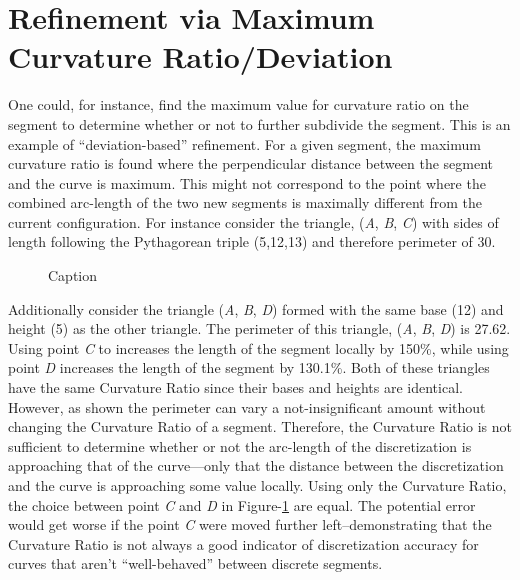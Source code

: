 \section{Refinement via Maximum Curvature Ratio/Deviation}
One could, for instance, find the maximum value for curvature ratio on the segment to determine whether or not to further subdivide the segment.  This is an example of “deviation-based” refinement.  For a given segment, the maximum curvature ratio is found where the perpendicular distance between the segment and the curve is maximum.  This might not correspond to the point where the combined arc-length of the two new segments is maximally different from the current configuration.  For instance consider the triangle, (\textit{A}, \textit{B}, \textit{C}) with sides of length following the Pythagorean triple (5,12,13) and therefore perimeter of 30.

\begin{figure}[h!]
  \caption{\label{CurvatureRatioTriangles} Caption}
\end{figure}

\noindent Additionally consider the triangle (\textit{A}, \textit{B}, \textit{D}) formed with the same base (12) and height (5) as the other triangle.  The perimeter of this triangle, (\textit{A}, \textit{B}, \textit{D}) is 27.62. Using point \textit{C} to increases the length of the segment locally by 150\%, while using point \textit{D} increases the length of the segment by 130.1\%.  Both of these triangles have the same Curvature Ratio since their bases and heights are identical.  However, as shown the perimeter can vary a not-insignificant amount without changing the Curvature Ratio of a segment.  Therefore, the Curvature Ratio is not sufficient to determine whether or not the arc-length of the discretization is approaching that of the curve—only that the distance between the discretization and the curve is approaching some value locally.  Using only the Curvature Ratio, the choice between point \textit{C} and \textit{D} in Figure-\ref{CurvatureRatioTriangles} are equal.  The potential error would get worse if the point \textit{C} were moved further left--demonstrating that the Curvature Ratio is not always a good indicator of discretization accuracy for curves that aren’t ``well-behaved'' between discrete segments.

